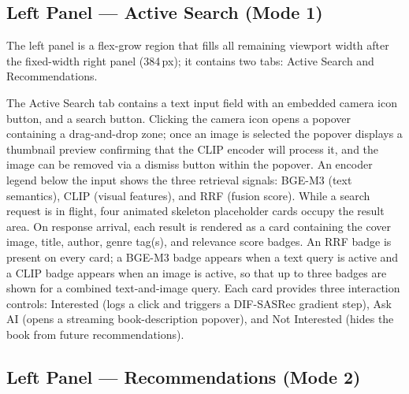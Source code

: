 \subsection{Left Panel — Active Search (Mode 1)}
\label{sec:app_search_panel}

The left panel is a flex-grow region that fills all remaining viewport width after the fixed-width right panel (384\,px); it contains two tabs: Active Search and Recommendations.

The Active Search tab contains a text input field with an embedded camera icon button, and a search button.
Clicking the camera icon opens a popover containing a drag-and-drop zone; once an image is selected the popover displays a thumbnail preview confirming that the CLIP encoder will process it, and the image can be removed via a dismiss button within the popover.
An encoder legend below the input shows the three retrieval signals: BGE-M3 (text semantics), CLIP (visual features), and RRF (fusion score).
While a search request is in flight, four animated skeleton placeholder cards occupy the result area.
On response arrival, each result is rendered as a card containing the cover image, title, author, genre tag(s), and relevance score badges.
An RRF badge is present on every card; a BGE-M3 badge appears when a text query is active and a CLIP badge appears when an image is active, so that up to three badges are shown for a combined text-and-image query.
Each card provides three interaction controls: Interested (logs a click and triggers a DIF-SASRec gradient step), Ask AI (opens a streaming book-description popover), and Not Interested (hides the book from future recommendations).

\subsection{Left Panel — Recommendations (Mode 2)}
\label{sec:app_rec_panel}

